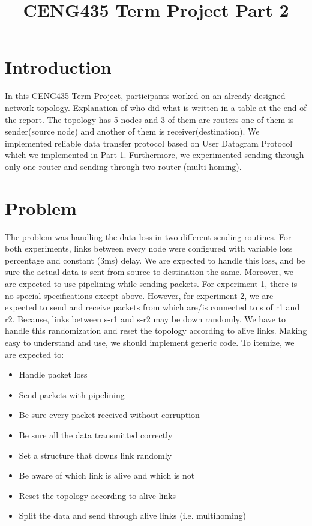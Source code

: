 \documentclass[conference]{IEEEtran}
\begin{document}
\title{CENG435 Term Project Part 2
}

\author{
\and
{}
}

\maketitle

\section{Introduction}
In this CENG435 Term Project, participants worked on an already designed network topology. Explanation of who did what is written in a table at the end of the report. The topology has 5 nodes and 3 of them are routers one of them is sender(source node) and another of them is receiver(destination). We implemented reliable data transfer protocol based on User Datagram Protocol which we implemented in Part 1. Furthermore, we experimented sending through only one router and sending through two router (multi homing).\\

\section{Problem}

The problem was handling the data loss in two different sending routines. For both experiments, links between every node were configured with variable loss percentage and constant (3ms) delay. We are expected to handle this loss, and be sure the actual data is sent from source to destination the same. Moreover, we are expected to use pipelining while sending packets. For experiment 1, there is no special specifications except above. However, for experiment 2, we are expected to send and receive packets from which are/is connected to s of r1 and r2. Because, links between s-r1 and s-r2 may be down randomly. We have to handle this randomization and reset the topology according to alive links. Making easy to understand and use, we should implement generic code. To itemize, we are expected to:
\begin{itemize}
    \item Handle packet loss
    \item Send packets with pipelining
    \item Be sure every packet received without corruption
    \item Be sure all the data transmitted correctly
    \item Set a structure that downs link randomly
    \item Be aware of which link is alive and which is not
    \item Reset the topology according to alive links
    \item Split the data and send through alive links (i.e. multihoming)
\end{itemize}
\end{document}
